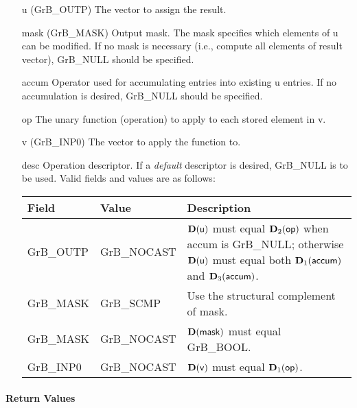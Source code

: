\begin{itemize}[leftmargin=1.1in]
    \item[{\sf u}]   ({\sf GrB\_OUTP}) The vector to assign the result.

    \item[{\sf mask}] ({\sf GrB\_MASK}) Output mask. The mask
    specifies which elements of {\sf u} can be modified.
    If no mask is necessary (i.e., compute all elements of result
    vector), {\sf GrB\_NULL} should be specified.

    \item[{\sf accum}]  Operator used for accumulating entries into existing {\sf u} entries. 
			If no accumulation is desired, {\sf GrB\_NULL} should be specified.

    \item[{\sf op}]    The unary function (operation) to apply to each stored element in {\sf v}.
    \item[{\sf v}]   ({\sf GrB\_INP0}) The vector to apply the function to.
    \item[{\sf desc}]   Operation descriptor. If a
    \emph{default} descriptor is desired, {\sf GrB\_NULL} is to be
    used.  Valid fields and values are as follows: \\
    \begin{tabular}{llp{3in}}
    Field  & Value & Description \\
    \hline
    {\sf GrB\_OUTP} & {\sf GrB\_NOCAST} & $\bold{D}({\sf u})$ must equal $\bold{D}_2({\sf op})$ when
                                          {\sf accum} is {\sf GrB\_NULL}; otherwise $\bold{D}({\sf u})$
                                          must equal both $\bold{D}_1({\sf accum})$ and $\bold{D}_3({\sf accum})$. \\
    {\sf GrB\_MASK} & {\sf GrB\_SCMP}   & Use the structural complement of {\sf mask}. \\
    {\sf GrB\_MASK} & {\sf GrB\_NOCAST} & $\bold{D}({\sf mask})$ must equal {\sf GrB\_BOOL}. \\
    {\sf GrB\_INP0} & {\sf GrB\_NOCAST} & $\bold{D}({\sf v})$ must equal $\bold{D}_1({\sf op})$.\\
    \end{tabular}
\end{itemize}

\paragraph{Return Values}

